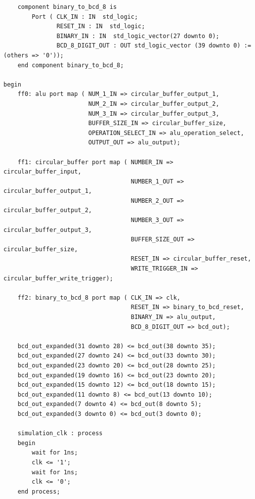 \documentclass[11pt]{article}
\newenvironment{code}{\captionsetup{type=listing}}{}
\begin{document}
\begin{code}
\begin{verbatim}
    component binary_to_bcd_8 is
        Port ( CLK_IN : IN  std_logic;
               RESET_IN : IN  std_logic;
               BINARY_IN : IN  std_logic_vector(27 downto 0);
               BCD_8_DIGIT_OUT : OUT std_logic_vector (39 downto 0) := (others => '0'));
    end component binary_to_bcd_8;

begin
    ff0: alu port map ( NUM_1_IN => circular_buffer_output_1,
                        NUM_2_IN => circular_buffer_output_2,
                        NUM_3_IN => circular_buffer_output_3,
                        BUFFER_SIZE_IN => circular_buffer_size,
                        OPERATION_SELECT_IN => alu_operation_select,
                        OUTPUT_OUT => alu_output);
    
    ff1: circular_buffer port map ( NUMBER_IN => circular_buffer_input,
                                    NUMBER_1_OUT => circular_buffer_output_1,
                                    NUMBER_2_OUT => circular_buffer_output_2,
                                    NUMBER_3_OUT => circular_buffer_output_3,
                                    BUFFER_SIZE_OUT => circular_buffer_size,
                                    RESET_IN => circular_buffer_reset,
                                    WRITE_TRIGGER_IN => circular_buffer_write_trigger);

    ff2: binary_to_bcd_8 port map ( CLK_IN => clk,
                                    RESET_IN => binary_to_bcd_reset,
                                    BINARY_IN => alu_output,
                                    BCD_8_DIGIT_OUT => bcd_out);
    
    bcd_out_expanded(31 downto 28) <= bcd_out(38 downto 35);
    bcd_out_expanded(27 downto 24) <= bcd_out(33 downto 30);
    bcd_out_expanded(23 downto 20) <= bcd_out(28 downto 25);
    bcd_out_expanded(19 downto 16) <= bcd_out(23 downto 20);
    bcd_out_expanded(15 downto 12) <= bcd_out(18 downto 15);
    bcd_out_expanded(11 downto 8) <= bcd_out(13 downto 10);
    bcd_out_expanded(7 downto 4) <= bcd_out(8 downto 5);
    bcd_out_expanded(3 downto 0) <= bcd_out(3 downto 0);

    simulation_clk : process
    begin
        wait for 1ns;
        clk <= '1';
        wait for 1ns;
        clk <= '0';
    end process;
    

\end{verbatim}
\end{code}
\end{document}
